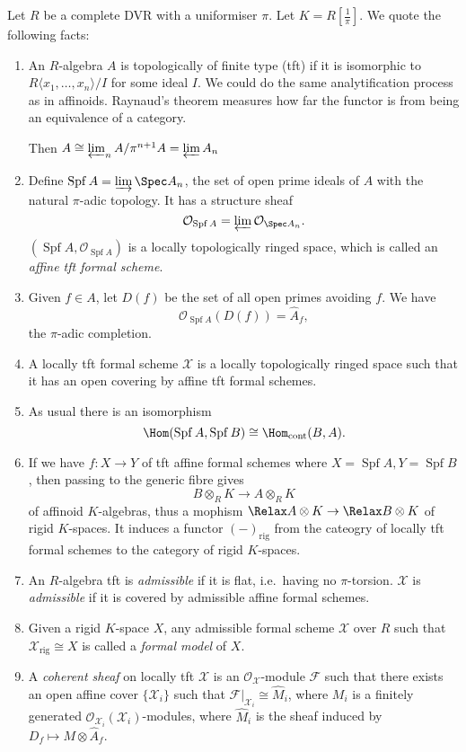 \documentclass[a4paper]{article}
\newcommand{\sh}[1]{\mathcal{#1}} %
\let\Sp\Relax
\DeclareMathOperator{\Sp}{Sp} %
\DeclareMathOperator{\Spf}{Spf}
\begin{document}
Let \(R\) be a complete DVR with a uniformiser \(\pi\). Let \(K = R[\frac{1}{\pi}]\). We quote the following facts:
\begin{enumerate}
\item An \(R\)-algebra \(A\) is topologically of finite type (tft) if it is isomorphic to \(R \langle x_1, \dots, x_n \rangle/I\) for some ideal \(I\). We could do the same analytification process as in affinoids. Raynaud's theorem measures how far the functor is from being an equivalence of a category.

  Then \(A \cong \varprojlim_n A/\pi^{n + 1}A = \varprojlim A_n\)
\item Define \(\Spf A= \varinjlim \Spec A_n\), the set of open prime ideals of \(A\) with the natural \(\pi\)-adic topology. It has a structure sheaf
  \[
    \sh O_{\Spf A} = \varprojlim \sh O_{\Spec A_n}.
  \]
  \((\Spf A, \sh O_{\Spf A})\) is a locally topologically ringed space, which is called an \emph{affine tft formal scheme}.
\item Given \(f \in A\), let \(D(f)\) be the set of all open primes avoiding \(f\). We have
  \[
    \sh O_{\Spf A}(D(f)) = \hat A_f,
  \]
  the \(\pi\)-adic completion.
\item A locally tft formal scheme \(\mathcal X\) is a locally topologically ringed space such that it has an open covering by affine tft formal schemes.
\item As usual there is an isomorphism
  \[
    \Hom(\Spf A, \Spf B) \cong \Hom_{\mathrm{cont}}(B, A).
  \]
\item If we have \(f: X \to Y\) of tft affine formal schemes where \(X = \Spf A, Y = \Spf B\), then passing to the generic fibre gives
  \[
    B \otimes_R K \to A \otimes_R K
  \]
  of affinoid \(K\)-algebras, thus a mophism \(\Sp A \otimes K \to \Sp B \otimes K\) of rigid \(K\)-spaces. It induces a functor \((-)_{\mathrm{rig}}\) from the cateogry of locally tft formal schemes to the category of rigid \(K\)-spaces.
\item An \(R\)-algebra tft is \emph{admissible} if it is flat, i.e.\ having no \(\pi\)-torsion. \(\mathcal X\) is \emph{admissible} if it is covered by admissible affine formal schemes.
\item Given a rigid \(K\)-space \(X\), any admissible formal scheme \(\mathcal X\) over \(R\) such that \(\mathcal X_{\mathrm{rig}} \cong X\) is called a \emph{formal model} of \(X\).
\item A \emph{coherent sheaf} on locally tft \(\mathcal X\) is an \(\sh O_{\mathcal X}\)-module \(\sh F\) such that there exists an open affine cover \(\{\mathcal X_i\}\) such that \(\sh F|_{\mathcal X_i} \cong \widehat M_i\), where \(M_i\) is a finitely generated \(\sh O_{\mathcal X_i}(\mathcal X_i)\)-modules, where \(\widehat M_i\) is the sheaf induced by \(D_f \mapsto M \otimes \hat A_f\).

\end{enumerate}
\end{document}

